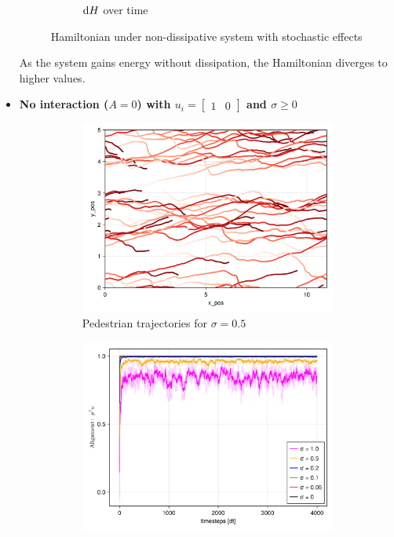 \begin{itemize}
\begin{figure}[H]
\begin{subfigure}{.49\textwidth}
            \caption{$\mathrm d H$ over time}
            \label{plot:stoc_nodisp_dh}
        \end{subfigure}
        \caption{Hamiltonian under non-dissipative system with stochastic effects}
        \label{plot:stoc_nodisp_hamiltonian}
    \end{figure}

As the system gains energy without dissipation, the Hamiltonian diverges to higher values.
    \item \textbf{No interaction ($A = 0$) with $u_i = \begin{bmatrix} 1 & 0 \end{bmatrix}$ and $\sigma \geq 0$}
    \begin{figure}[H]
        \centering
        \begin{subfigure}{.49\textwidth}
            \centering
            \includegraphics[width=\linewidth]{figures/ch5_basic_stoch/traj_stochastic_nointeraction_10000.png}
            \caption{Pedestrian trajectories for $\sigma = 0.5$}
            \label{plot:stoc_nointeraction_traj}
        \end{subfigure}
        \begin{subfigure}{.49\textwidth}
            \centering
            \includegraphics[width=\linewidth]{figures/ch5_basic_stoch/align_stochastic_nointeraction.png}

\end{subfigure}
\end{figure}
\end{itemize}
